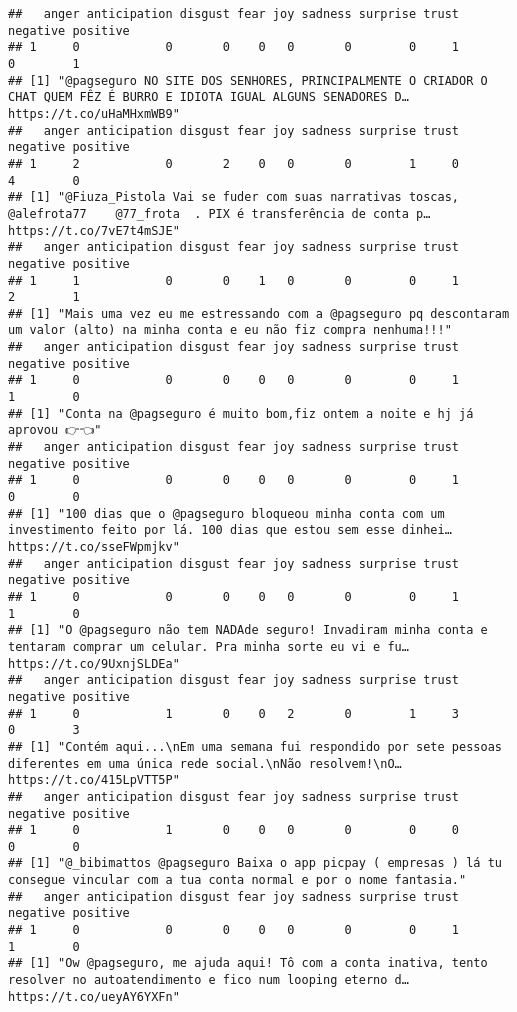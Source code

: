 \documentclass[
]{article}
\begin{document}
\begin{verbatim}
##   anger anticipation disgust fear joy sadness surprise trust negative positive
## 1     0            0       0    0   0       0        0     1        0        1
## [1] "@pagseguro NO SITE DOS SENHORES, PRINCIPALMENTE O CRIADOR O CHAT QUEM FÊZ É BURRO E IDIOTA IGUAL ALGUNS SENADORES D… https://t.co/uHaMHxmWB9"
##   anger anticipation disgust fear joy sadness surprise trust negative positive
## 1     2            0       2    0   0       0        1     0        4        0
## [1] "@Fiuza_Pistola Vai se fuder com suas narrativas toscas,  @alefrota77    @77_frota  . PIX é transferência de conta p… https://t.co/7vE7t4mSJE"
##   anger anticipation disgust fear joy sadness surprise trust negative positive
## 1     1            0       0    1   0       0        0     1        2        1
## [1] "Mais uma vez eu me estressando com a @pagseguro pq descontaram um valor (alto) na minha conta e eu não fiz compra nenhuma!!!"
##   anger anticipation disgust fear joy sadness surprise trust negative positive
## 1     0            0       0    0   0       0        0     1        1        0
## [1] "Conta na @pagseguro é muito bom,fiz ontem a noite e hj já aprovou 👉👈"
##   anger anticipation disgust fear joy sadness surprise trust negative positive
## 1     0            0       0    0   0       0        0     1        0        0
## [1] "100 dias que o @pagseguro bloqueou minha conta com um investimento feito por lá. 100 dias que estou sem esse dinhei… https://t.co/sseFWpmjkv"
##   anger anticipation disgust fear joy sadness surprise trust negative positive
## 1     0            0       0    0   0       0        0     1        1        0
## [1] "O @pagseguro não tem NADAde seguro! Invadiram minha conta e tentaram comprar um celular. Pra minha sorte eu vi e fu… https://t.co/9UxnjSLDEa"
##   anger anticipation disgust fear joy sadness surprise trust negative positive
## 1     0            1       0    0   2       0        1     3        0        3
## [1] "Contém aqui...\nEm uma semana fui respondido por sete pessoas diferentes em uma única rede social.\nNão resolvem!\nO… https://t.co/415LpVTT5P"
##   anger anticipation disgust fear joy sadness surprise trust negative positive
## 1     0            1       0    0   0       0        0     0        0        0
## [1] "@_bibimattos @pagseguro Baixa o app picpay ( empresas ) lá tu consegue vincular com a tua conta normal e por o nome fantasia."
##   anger anticipation disgust fear joy sadness surprise trust negative positive
## 1     0            0       0    0   0       0        0     1        1        0
## [1] "Ow @pagseguro, me ajuda aqui! Tô com a conta inativa, tento resolver no autoatendimento e fico num looping eterno d… https://t.co/ueyAY6YXFn"

\end{verbatim}
\end{document}
